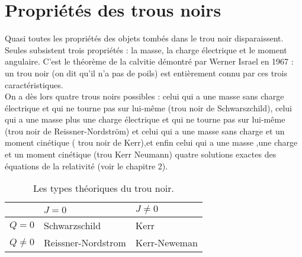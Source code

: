 	\section{Propriétés des trous noirs }
	Quasi toutes les propriétés des objets tombés dans le trou noir disparaissent. Seules subsistent trois propriétés : la masse, la charge électrique et le moment angulaire. C’est le théorème de la calvitie démontré par Werner Israel en 1967 : un trou noir (on dit qu'il n'a pas de poils) est entièrement connu par ces trois caractéristiques.\\
	On a dès lors quatre trous noirs possibles : celui qui a une masse sans charge électrique et qui ne tourne pas sur lui-même (trou noir de Schwarszchild), celui qui a une masse plus une charge électrique et qui ne tourne pas sur lui-même  (trou noir de Reissner-Nordström) et celui qui a une masse sans charge et un moment cinétique ( trou noir de Kerr),et enfin celui qui a une masse ,une charge et un moment cinétique (trou Kerr Neumann) quatre solutions exactes des équations de la relativité (voir le chapitre 2). 
		
		\begin{table}[H]
			\begin{center}
			\centering
		
			{ \renewcommand{\arraystretch}{1.9}
				
				\begin{tabular}{|l|l|l|}
					\hline
					& $J=0$ & $J\neq 0$\\
					\hline
					$Q=0$ & Schwarzschild &  Kerr \\
					
					\hline
					$Q\neq 0$ & Reissner-Nordstrom  & Kerr-Neweman \\
					\hline
					
					\hline
					
			\end{tabular}}
			\end{center}
			\caption{Les types théoriques du trou noir.}
		\end{table}
		
	
	\newpage 	
